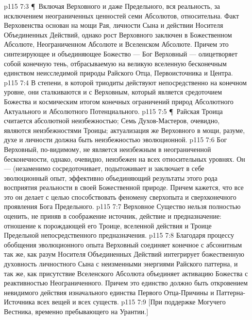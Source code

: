 \vs p115 7:3 \P\ Включая Верховного и даже Предельного, вся реальность, за исключением неограниченных ценностей семи Абсолютов, относительна. Факт Верховенства основан на мощи Рая, личности Сына и действии Носителя Объединенных Действий, однако рост Верховного заключен в Божественном Абсолюте, Неограниченном Абсолюте и Вселенском Абсолюте. Причем это синтезирующее и объединяющее Божество --- Бог Верховный --- олицетворяет собой конечную тень, отбрасываемую на великую вселенную бесконечным единством неисследимой природы Райского Отца, Первоисточника и Центра.
\vs p115 7:4 В степени, в которой триодиты действуют непосредственно на конечном уровне, они сталкиваются и с Верховным, который является средоточием Божества и космическим итогом конечных ограничений природ Абсолютного Актуального и Абсолютного Потенциального.
\vs p115 7:5 \P\ Райская Троица считается абсолютной неизбежностью; Семь Духов\hyp{}Мастеров, очевидно, являются неизбежностями Троицы; актуализация же Верховного в мощи, разуме, духе и личности должна быть неизбежностью эволюционной.
\vs p115 7:6 Бог Верховный, по\hyp{}видимому, не является неизбежным в неограниченной бесконечности, однако, очевидно, неизбежен на всех относительных уровнях. Он --- (незаменимо сосредоточивает, подытоживает и заключает в себе эволюционный опыт, эффективно объединяющий результаты этого рода восприятия реальности в своей Божественной природе. Причем кажется, что все это он делает с целью способствовать феномену  сверхопыта и сверхконечного проявления Бога Предельного.
\vs p115 7:7 Верховное Существо нельзя полностью оценить, не приняв в соображение источник, действие и предназначение: отношение к порождающей его Троице, вселенной действия и Троице Предельной непосредственного предназначения.
\vs p115 7:8 Благодаря процессу обобщения эволюционного опыта Верховный соединяет конечное с абсонитным так же, как разум Носителя Объединенных Действий интегрирует божественную духовность личностного Сына с неизменными энергиями Райского паттерна, и так же, как присутствие Вселенского Абсолюта объединяет активацию Божества с реактивностью Неограниченного. Причем это единство должно быть откровением невидимого действия изначального единства Первого Отца\hyp{}Причины и Паттерна\hyp{}Источника всех вещей и всех существ.
\vs p115 7:9 [При поддержке Могучего Вестника, временно пребывающего на Урантии.]
